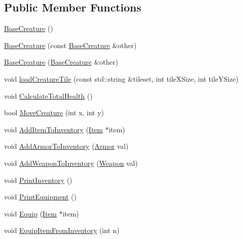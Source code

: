 \subsection*{Public Member Functions}
\begin{DoxyCompactItemize}
\item 
\mbox{\hyperlink{class_base_creature_aed503a9552a9d28233012f7a7b74d9bc}{Base\+Creature}} ()
\item 
\mbox{\hyperlink{class_base_creature_adda13b6dcb4365d47210e34f2dcdc8ba}{Base\+Creature}} (const \mbox{\hyperlink{class_base_creature}{Base\+Creature}} \&other)
\item 
\mbox{\hyperlink{class_base_creature_aa496d94797fc52d3db909b78d8ee24d4}{Base\+Creature}} (\mbox{\hyperlink{class_base_creature}{Base\+Creature}} \&other)
\item 
void \mbox{\hyperlink{class_base_creature_af2066b8eb62bf595d30feae6671e4495}{load\+Creature\+Tile}} (const std\+::string \&tileset, int tile\+X\+Size, int tile\+Y\+Size)
\item 
void \mbox{\hyperlink{class_base_creature_ac5c9f52046801eb47701ef8b0f1eb32c}{Calculate\+Total\+Health}} ()
\item 
bool \mbox{\hyperlink{class_base_creature_a77f0a7d7c441406c252c3278817454d8}{Move\+Creature}} (int x, int y)
\item 
void \mbox{\hyperlink{class_base_creature_ab6f0139afb4e1b15d5f1feecc267580d}{Add\+Item\+To\+Inventory}} (\mbox{\hyperlink{class_item}{Item}} $\ast$item)
\item 
void \mbox{\hyperlink{class_base_creature_a03122a2c070fe7cab0dc772f552f1a63}{Add\+Armor\+To\+Inventory}} (\mbox{\hyperlink{class_armor}{Armor}} val)
\item 
void \mbox{\hyperlink{class_base_creature_ab0a90200835bc80c6db29e31f98d35e9}{Add\+Weapon\+To\+Inventory}} (\mbox{\hyperlink{class_weapon}{Weapon}} val)
\item 
void \mbox{\hyperlink{class_base_creature_a097ec44d0b215f75ca75ae69c2bd11be}{Print\+Inventory}} ()
\item 
void \mbox{\hyperlink{class_base_creature_ac3d7907a8d8e0967a5881ff180205028}{Print\+Equipment}} ()
\item 
void \mbox{\hyperlink{class_base_creature_a82807038eafe46f7ac510a99a4cdc25e}{Equip}} (\mbox{\hyperlink{class_item}{Item}} $\ast$item)
\item 
void \mbox{\hyperlink{class_base_creature_a637cb7174d9bb9677a21281ff19fb10a}{Equip\+Item\+From\+Inventory}} (int n)
\item 

\end{DoxyCompactItemize}
